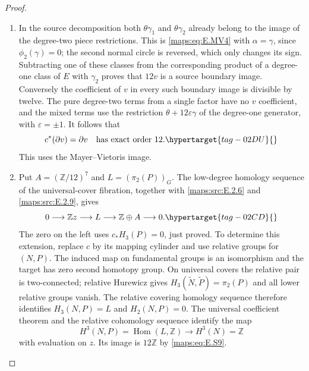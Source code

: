\documentclass[11pt,a4paper]{article}
\numberwithin{equation}{section}
\theoremstyle{definition}
\begin{document}
\begin{proof}
\begin{enumerate}[label=\arabic*.,leftmargin=*]
\item In the source decomposition both $\theta\gamma_1$ and
$\theta\gamma_2$ already belong to the image of the degree-two
piece restrictions. This is \eqref{maps:eq:E.MV4} with $\alpha=\gamma$,
since $\phi_2(\gamma)=0$; the second normal circle is reversed,
which only changes its sign. Subtracting one of these classes
from the corresponding product of a degree-one class of $E$
with $\gamma_2$ proves that $12v$ is a source boundary image.
Conversely the coefficient of $v$ in every such boundary image
is divisible by twelve. The pure degree-two terms from a single
factor have no $v$ coefficient, and the mixed terms use the
restriction $\theta+12\varepsilon\gamma$ of the degree-one
generator, with $\varepsilon=\pm1$. It follows that
\begin{equation}
                  c^*(\partial v)=\partial v
        \quad\text{has exact order }12.
 \hypertarget{tag-02DU}{}\label{maps:eq:E.S9}
\end{equation}
This uses the Mayer--Vietoris image.

\item Put $A=(\mathbb Z/12)^7$ and $L=(\pi_2(P))_G$.
The low-degree homology sequence of the universal-cover
fibration, together with \ref{maps:src:E.2.6} and \ref{maps:src:E.2.9}, gives
\begin{equation}
             0\longrightarrow\mathbb Z z\longrightarrow L
                \longrightarrow\mathbb Z\oplus A\longrightarrow0.
 \hypertarget{tag-02CD}{}\label{maps:eq:E.S10}
\end{equation}
The zero on the left uses $c_*H_3(P)=0$, just proved.
To determine this extension, replace $c$ by its mapping cylinder
and use relative groups for $(N,P)$. The induced map on fundamental
groups is an isomorphism and the target has zero second homotopy
group. On universal covers the relative pair is two-connected;
relative Hurewicz gives
$H_3(\widetilde N,\widetilde P)=\pi_2(P)$ and all lower relative
groups vanish. The relative covering homology sequence therefore
identifies $H_3(N,P)=L$ and $H_2(N,P)=0$.
The universal coefficient theorem and the relative cohomology
sequence identify the map
\[
       H^3(N,P)=\operatorname{Hom}(L,\mathbb Z)
         \longrightarrow H^3(N)=\mathbb Z
\]
with evaluation on $z$. Its image is $12\mathbb Z$ by \eqref{maps:eq:E.S9}.


\end{enumerate}
\end{proof}
\end{document}
